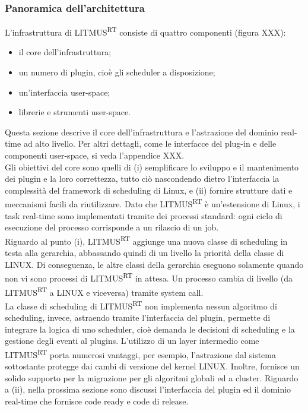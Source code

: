 \subsubsection{Panoramica dell'architettura}
\label{sec:intro.arch}

L'infrastruttura di LITMUS\textsuperscript{RT} consiste di quattro componenti (figura XXX):

\begin{itemize}
\item il core dell'infrastruttura;
\item un numero di plugin, cioè gli scheduler a disposizione;
\item un'interfaccia user-space;
\item librerie e strumenti user-space.
\end{itemize}

Questa sezione descrive il core dell'infrastruttura e l'astrazione del dominio real-time ad alto livello. Per altri dettagli, come le interfacce del plug-in e delle componenti user-space, si veda l'appendice XXX.\\

Gli obiettivi del core sono quelli di (i) semplificare lo sviluppo e il mantenimento dei plugin e la loro correttezza, tutto ciò nascondendo dietro l'interfaccia la complessità del framework di scheduling di Linux, e (ii) fornire strutture dati e meccanismi facili da riutilizzare. Dato che LITMUS\textsuperscript{RT} è un'estensione di Linux, i task real-time sono implementati tramite dei processi standard: ogni ciclo di esecuzione del processo corrisponde a un rilascio di un job.\\
Riguardo al punto (i), LITMUS\textsuperscript{RT} aggiunge una nuova classe di scheduling in testa alla gerarchia, abbassando quindi di un livello la priorità della classe di LINUX. Di conseguenza, le altre classi della gerarchia eseguono solamente quando non vi sono processi di LITMUS\textsuperscript{RT} in attesa. Un processo cambia di livello (da LITMUS\textsuperscript{RT} a LINUX e viceversa) tramite system call.\\
La classe di scheduling di LITMUS\textsuperscript{RT} non implementa nessun algoritmo di scheduling, invece, astraendo tramite l'interfaccia del plugin, permette di integrare la logica di uno scheduler, cioè demanda le decisioni di scheduling e la gestione degli eventi al plugins.
L'utilizzo di un layer intermedio come LITMUS\textsuperscript{RT} porta numerosi vantaggi, per esempio, l'astrazione dal sistema sottostante protegge dai cambi di versione del kernel LINUX. Inoltre, fornisce un solido supporto per la migrazione per gli algoritmi globali ed a cluster.
Riguardo a (ii), nella prossima sezione sono discussi l'interfaccia del plugin ed il dominio real-time che fornisce code ready e code di release.

